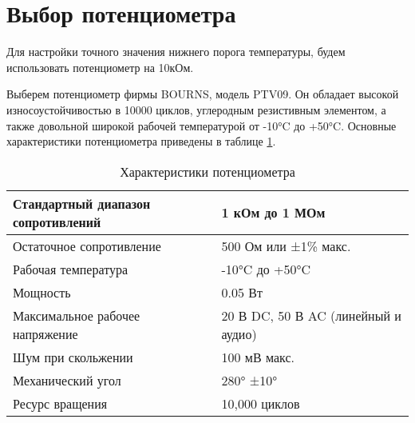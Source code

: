 \section {Выбор потенциометра}

Для настройки точного значения нижнего порога температуры, будем использовать потенциометр на 10кОм.

Выберем потенциометр фирмы BOURNS, модель PTV09. Он обладает высокой износоустойчивостью в 10000 циклов, углеродным резистивным элементом, а также довольной широкой рабочей температурой от -10°C до +50°C. Основные характеристики потенциометра приведены в таблице \ref{tab::PotentiometerCharact}.

\begin{table}[h!]
	\centering
	\caption{Характеристики потенциометра}
	\begin{tabular}{| m{6cm} | m{8cm} |}
		\hline
		Стандартный диапазон сопротивлений & 1 кОм до 1 МОм \\ \hline
		Остаточное сопротивление & 500 Ом или ±1\% макс. \\ \hline
		Рабочая температура & -10°C до +50°C \\ \hline
		Мощность & 0.05 Вт\\ \hline
		Максимальное рабочее напряжение & 20 В DC, 50 В AC (линейный и аудио) \\ \hline
		Шум при скольжении & 100 мВ макс. \\ \hline
		Механический угол & 280° ±10° \\ \hline
		Ресурс вращения & 10,000 циклов \\ \hline
	\end{tabular}
	\label{tab::PotentiometerCharact}
\end{table}